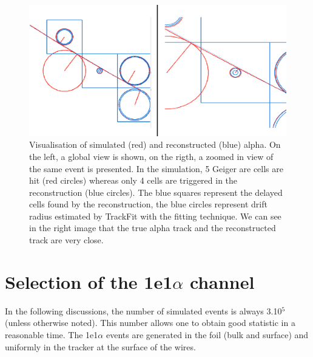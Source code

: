 \documentclass[main.tex]{subfiles}
\begin{document}
\begin{figure}[h!]
\begin{center}
\includegraphics[scale=0.6]{pictures/Chap5/dessin.pdf}
\caption{Visualisation of simulated (red) and reconstructed (blue) alpha. On the left, a global view is shown, on the rigth, a zoomed in view of the same event is presented. In the simulation, 5 Geiger are cells are hit (red circles) whereas only 4 cells are triggered in the reconstruction (blue circles). The blue squares represent the delayed cells found by the reconstruction, the blue circles represent drift radius estimated by TrackFit with the fitting technique. We can see in the right image that the true alpha track and the reconstructed track are very close.}
\label{timeRecovisu}
\end{center}
\end{figure}


\FloatBarrier




\section{Selection of the 1e1$\alpha$ channel}\label{sec:Selection1e1aChannel}

	
\noindent In the following discussions, the number of simulated events is always 3.10$^\text{5}$ (unless otherwise noted). This number allows one to obtain good statistic in a reasonable time. The 1e1$\alpha$ events are generated in the foil (bulk and surface) and uniformly in the tracker at the surface of the wires. %
\end{document}
